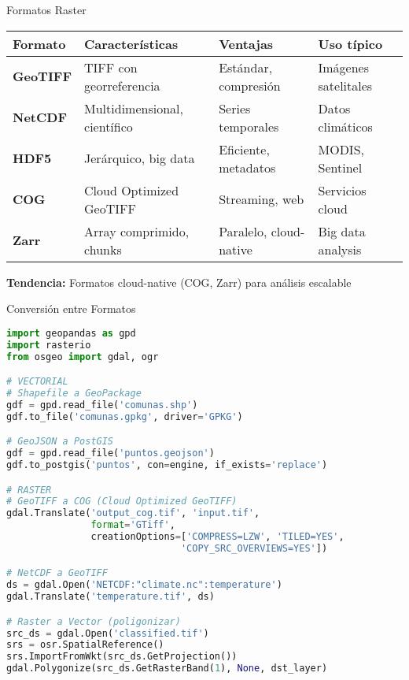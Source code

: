 \documentclass[10pt]{beamer}
\begin{document}
\begin{frame}{Formatos Raster}
    \begin{tabular}{|l|p{3cm}|p{3cm}|p{3cm}|}
        \hline
        \textbf{Formato} & \textbf{Características} & \textbf{Ventajas} & \textbf{Uso típico} \\
        \hline
        \textbf{GeoTIFF} & 
        TIFF con georreferencia & 
        Estándar, compresión & 
        Imágenes satelitales \\
        \hline
        \textbf{NetCDF} & 
        Multidimensional, científico & 
        Series temporales & 
        Datos climáticos \\
        \hline
        \textbf{HDF5} & 
        Jerárquico, big data & 
        Eficiente, metadatos & 
        MODIS, Sentinel \\
        \hline
        \textbf{COG} & 
        Cloud Optimized GeoTIFF & 
        Streaming, web & 
        Servicios cloud \\
        \hline
        \textbf{Zarr} & 
        Array comprimido, chunks & 
        Paralelo, cloud-native & 
        Big data analysis \\
        \hline
    \end{tabular}
    
    \vspace{0.3cm}
    
    \begin{tcolorbox}[colframe=usachorange,colback=orange!5]
        \small
        \textbf{Tendencia:} Formatos cloud-native (COG, Zarr) para análisis escalable
    \end{tcolorbox}
\end{frame}

\begin{frame}[fragile]{Conversión entre Formatos}
    \begin{lstlisting}[language=Python, caption=Conversión de formatos con Python]
import geopandas as gpd
import rasterio
from osgeo import gdal, ogr

# VECTORIAL
# Shapefile a GeoPackage
gdf = gpd.read_file('comunas.shp')
gdf.to_file('comunas.gpkg', driver='GPKG')

# GeoJSON a PostGIS
gdf = gpd.read_file('puntos.geojson')
gdf.to_postgis('puntos', con=engine, if_exists='replace')

# RASTER
# GeoTIFF a COG (Cloud Optimized GeoTIFF)
gdal.Translate('output_cog.tif', 'input.tif',
               format='GTiff',
               creationOptions=['COMPRESS=LZW', 'TILED=YES',
                               'COPY_SRC_OVERVIEWS=YES'])

# NetCDF a GeoTIFF
ds = gdal.Open('NETCDF:"climate.nc":temperature')
gdal.Translate('temperature.tif', ds)

# Raster a Vector (poligonizar)
src_ds = gdal.Open('classified.tif')
srs = osr.SpatialReference()
srs.ImportFromWkt(src_ds.GetProjection())
gdal.Polygonize(src_ds.GetRasterBand(1), None, dst_layer)
    \end{lstlisting}
\end{frame}
\end{document}
